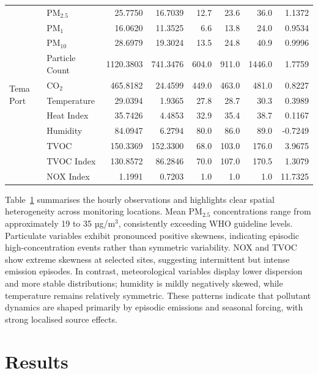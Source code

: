 \documentclass[a4paper,fleqn]{cas-sc}
\begin{document}
\begin{table}[htb]
{\begin{tabular}{llrrrrrr}
\multirow{11}{*}{Tema Port}
& PM$_{2.5}$ & 25.7750 & 16.7039 & 12.7 & 23.6 & 36.0 & 1.1372 \\
& PM$_1$ & 16.0620 & 11.3525 & 6.6 & 13.8 & 24.0 & 0.9534 \\
& PM$_{10}$ & 28.6979 & 19.3024 & 13.5 & 24.8 & 40.9 & 0.9996 \\
& Particle Count & 1120.3803 & 741.3476 & 604.0 & 911.0 & 1446.0 & 1.7759 \\
& CO$_2$ & 465.8182 & 24.4599 & 449.0 & 463.0 & 481.0 & 0.8227 \\
& Temperature & 29.0394 & 1.9365 & 27.8 & 28.7 & 30.3 & 0.3989 \\
& Heat Index & 35.7426 & 4.4853 & 32.9 & 35.4 & 38.7 & 0.1167 \\
& Humidity & 84.0947 & 6.2794 & 80.0 & 86.0 & 89.0 & -0.7249 \\
& TVOC & 150.3369 & 152.3300 & 68.0 & 103.0 & 176.0 & 3.9675 \\
& TVOC Index & 130.8572 & 86.2846 & 70.0 & 107.0 & 170.5 & 1.3079 \\
& NOX Index & 1.1991 & 0.7203 & 1.0 & 1.0 & 1.0 & 11.7325 \\
\bottomrule
\end{tabular}}
\label{tab:timeseries-data}
\end{table}

Table~\ref{tab:timeseries-data} summarises the hourly observations and highlights clear spatial heterogeneity across monitoring locations. Mean PM$_{2.5}$ concentrations range from approximately 19 to 35 µg/m$^3$, consistently exceeding WHO guideline levels. Particulate variables exhibit pronounced positive skewness, indicating episodic high-concentration events rather than symmetric variability. NOX and TVOC show extreme skewness at selected sites, suggesting intermittent but intense emission episodes. In contrast, meteorological variables display lower dispersion and more stable distributions; humidity is mildly negatively skewed, while temperature remains relatively symmetric. These patterns indicate that pollutant dynamics are shaped primarily by episodic emissions and seasonal forcing, with strong localised source effects.





\section{Results}\label{sec3}
\end{document}

